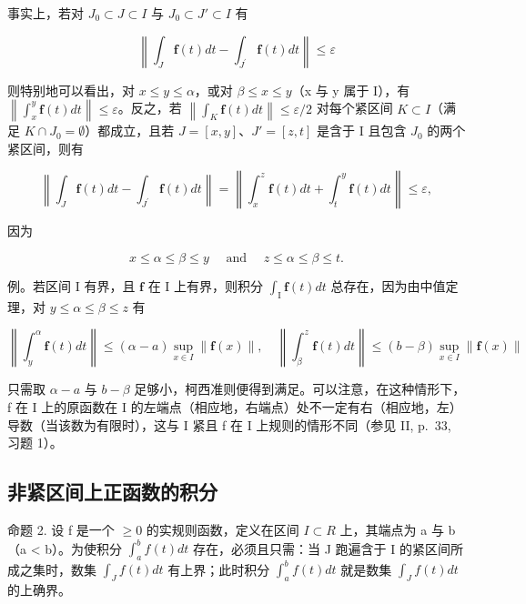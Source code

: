 事实上，若对 \(J_{0} \subset J \subset I\) 与 \(J_{0} \subset J' \subset I\) 有

\[
\left\| \int_ {J} \mathbf {f} (t) d t - \int_ {J ^ {\prime}} \mathbf {f} (t) d t \right\| \leqslant \varepsilon
\]

则特别地可以看出，对 \(x \leqslant y \leqslant \alpha\)，或对 \(\beta \leqslant x \leqslant y\)（x 与 y 属于 I），有 \(\left\|\int_{x}^{y} \mathbf{f}(t) dt\right\| \leqslant \varepsilon\)。反之，若 \(\left\|\int_{K} \mathbf{f}(t) dt\right\| \leqslant \varepsilon/2\) 对每个紧区间 \(K \subset I\)（满足 \(K \cap J_{0} = \emptyset\)）都成立，且若 \(J = [x, y]\)、\(J' = [z, t]\) 是含于 I 且包含 \(J_{0}\) 的两个紧区间，则有

\[
\left\| \int_ {J} \mathbf {f} (t) d t - \int_ {J ^ {\prime}} \mathbf {f} (t) d t \right\| = \left\| \int_ {x} ^ {z} \mathbf {f} (t) d t + \int_ {t} ^ {y} \mathbf {f} (t) d t \right\| \leqslant \varepsilon ,
\]

因为

\[
x \leqslant \alpha \leqslant \beta \leqslant y \quad \text { and } \quad z \leqslant \alpha \leqslant \beta \leqslant t.
\]

例。若区间 I 有界，且 \(\mathbf{f}\) 在 I 上有界，则积分 \(\int_{\mathrm{I}}\mathbf{f}(t)dt\) 总存在，因为由中值定理，对 \(y\leqslant \alpha \leqslant \beta \leqslant z\) 有

\[
\left\| \int_ {y} ^ {\alpha} \mathbf {f} (t) d t \right\| \leqslant (\alpha - a) \sup _ {x \in I} \| \mathbf {f} (x) \|, \quad \left\| \int_ {\beta} ^ {z} \mathbf {f} (t) d t \right\| \leqslant (b - \beta) \sup _ {x \in I} \| \mathbf {f} (x) \|
\]

只需取 \(\alpha - a\) 与 \(b - \beta\) 足够小，柯西准则便得到满足。可以注意，在这种情形下，f 在 I 上的原函数在 I 的左端点（相应地，右端点）处不一定有右（相应地，左）导数（当该数为有限时），这与 I 紧且 f 在 I 上规则的情形不同（参见 II, p.~33, 习题 1）。

\subsection{非紧区间上正函数的积分}

命题 2. 设 f 是一个 \(\geqslant 0\) 的实规则函数，定义在区间 \(I \subset R\) 上，其端点为 a 与 b（a \textless{} b）。为使积分 \(\int_{a}^{b} f(t) dt\) 存在，必须且只需：当 J 跑遍含于 I 的紧区间所成之集时，数集 \(\int_{J} f(t) dt\) 有上界；此时积分 \(\int_{a}^{b} f(t) dt\) 就是数集 \(\int_{J} f(t) dt\) 的上确界。

